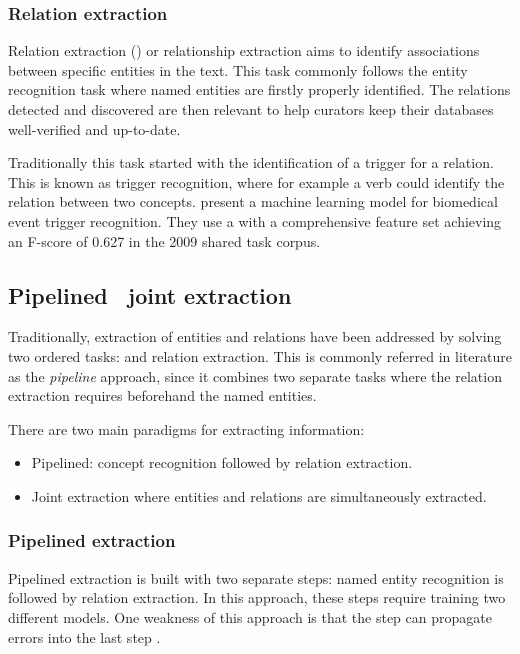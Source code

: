 \subsubsection{Relation extraction}

Relation extraction () or relationship extraction aims to identify associations between specific entities in the text.
This task commonly follows the entity recognition task where named entities are firstly properly identified.
The relations detected and discovered are then relevant to help curators keep their databases well-verified and up-to-date.

Traditionally this task started with the identification of a trigger for a relation.
This is known as trigger recognition, where for example a verb could identify the relation between two concepts.
\textcite{campos2014a} present a machine learning model for biomedical event trigger recognition. They use a  with a comprehensive feature set achieving an F-score of 0.627 in the  2009 shared task corpus.


\subsection{Pipelined \versus\ joint extraction}

Traditionally, extraction of entities and relations have been addressed by solving two ordered tasks:  and relation extraction. This is commonly referred in literature as the \emph{pipeline} approach, since it combines two separate tasks where the relation extraction requires beforehand the named entities.

There are two main paradigms for extracting information:

\begin{itemize}
\item
Pipelined: concept recognition followed by relation extraction.
\item
Joint extraction where entities and relations are simultaneously extracted.
\end{itemize}


\subsubsection{Pipelined extraction}

Pipelined extraction is built with two separate steps: named entity recognition is followed by relation extraction. In this approach, these steps require training two different models.
One weakness of this approach is that the  step can propagate errors into the last step \parencite{li2014b}.



